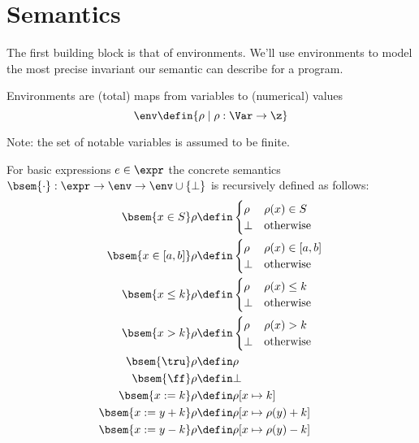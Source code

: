 \section{Semantics}

The first building block is that of environments. We'll use
environments to model the most precise invariant our semantic can
describe for a program.

\begin{definition}[Environments]
  Environments are (total) maps from variables to (numerical)
  values \[\env \defin \{\rho \mid \rho : \Var \to \z\}\]

  Note: the set of notable variables is assumed to be finite.
\end{definition}

\begin{definition}
  For basic expressions \(e \in \expr\) the concrete semantics \(\bsem{
    \cdot} : \expr \to \env \to \env \cup \{\bot\}\) is recursively
  defined as follows:
  \begin{align*}
    \bsem{x\in S} \rho & \defin \begin{cases} \rho & \rho(x)\in S \\ \bot & \text{otherwise} \end{cases} \\
    \bsem{x\in [a,b]} \rho & \defin \begin{cases} \rho & \rho(x)\in [a,b] \\ \bot & \text{otherwise} \end{cases} \\
    \bsem{x \leq k} \rho & \defin \begin{cases} \rho & \rho(x)\leq k \\ \bot & \text{otherwise} \end{cases} \\
    \bsem{x > k} \rho & \defin \begin{cases} \rho & \rho(x) > k \\ \bot & \text{otherwise} \end{cases} \\
    \bsem{\tru} \rho & \defin \rho \\
    \bsem{\ff} \rho & \defin \bot \\
    \bsem{x := k} \rho & \defin \rho [x \mapsto k] \\
    \bsem{x := y + k} \rho & \defin \rho [x \mapsto \rho(y) + k] \\
    \bsem{x := y - k} \rho & \defin \rho [x \mapsto \rho(y) - k] \\
  \end{align*}
\end{definition}

